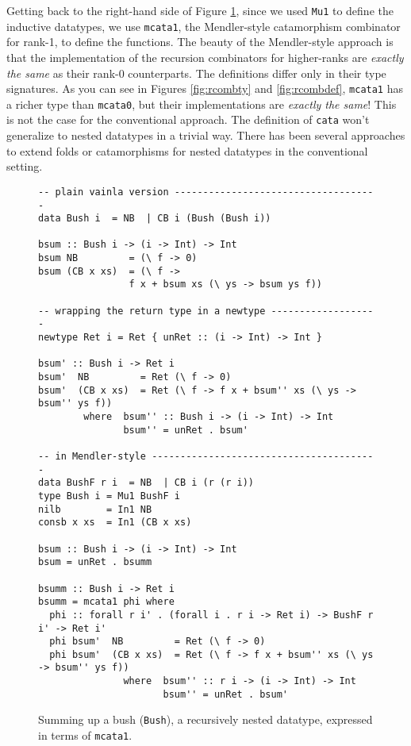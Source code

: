 \documentclass[letterpaper,12pt]{article}
\begin{document}
Getting back to the right-hand side of Figure \ref{fig:bsum},
since we used \verb|Mu1| to define the inductive datatypes, we use \verb|mcata1|, the
Mendler-style catamorphism combinator for rank-1, to define the functions.
The beauty of the Mendler-style approach is that the implementation
of the recursion combinators for
higher-ranks are \emph{exactly the same} as their rank-0 counterparts. The
definitions differ only in their type signatures. As you can see in Figures 
\ref{fig:rcombty} and \ref{fig:rcombdef}, %
\verb|mcata1| has a richer type than
\verb|mcata0|, but their implementations are \emph{exactly the same}!
This is not the case for the conventional approach.
The definition of \verb|cata| won't generalize to nested datatypes in a trivial way.
There has been several approaches \cite{BirPat99,MarGibBay04,Hin00}
to extend folds or catamorphisms for nested datatypes
in the conventional setting.

\begin{figure}
\begin{verbatim}
-- plain vainla version ------------------------------------
data Bush i  = NB  | CB i (Bush (Bush i))

bsum :: Bush i -> (i -> Int) -> Int
bsum NB         = (\ f -> 0)
bsum (CB x xs)  = (\ f ->
                f x + bsum xs (\ ys -> bsum ys f))

-- wrapping the return type in a newtype -------------------
newtype Ret i = Ret { unRet :: (i -> Int) -> Int }

bsum' :: Bush i -> Ret i
bsum'  NB         = Ret (\ f -> 0)
bsum'  (CB x xs)  = Ret (\ f -> f x + bsum'' xs (\ ys -> bsum'' ys f))
        where  bsum'' :: Bush i -> (i -> Int) -> Int                
               bsum'' = unRet . bsum'       

-- in Mendler-style ----------------------------------------
data BushF r i  = NB  | CB i (r (r i))
type Bush i = Mu1 BushF i
nilb        = In1 NB
consb x xs  = In1 (CB x xs)

bsum :: Bush i -> (i -> Int) -> Int
bsum = unRet . bsumm

bsumm :: Bush i -> Ret i
bsumm = mcata1 phi where
  phi :: forall r i' . (forall i . r i -> Ret i) -> BushF r i' -> Ret i'
  phi bsum'  NB         = Ret (\ f -> 0)
  phi bsum'  (CB x xs)  = Ret (\ f -> f x + bsum'' xs (\ ys -> bsum'' ys f))
               where  bsum'' :: r i -> (i -> Int) -> Int
                      bsum'' = unRet . bsum'
\end{verbatim}
\caption{Summing up a bush (\texttt{Bush}), a recursively nested datatype,
         expressed in terms of \texttt{mcata1}.}
\label{fig:bsum}
\end{figure}
\end{document}
